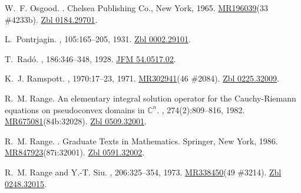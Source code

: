 \documentclass[11pt,a4paper, final, twoside]{article}
\numberwithin{equation}{section}
\begin{document}
\begin{appendices}
\begin{thebibliography}{100}
W.~F. Osgood.
.
\newblock Chelsea Publishing Co., New York, 1965.
\newblock \href{http://www.ams.org/mathscinet-getitem?mr=196039}{MR196039}(33
  \#4233b). \href{http://zbmath.org/?q=an:0184.29701}{Zbl 0184.29701}.

L.~Pontrjagin.
, 105:165--205, 1931.
\newblock \href{http://zbmath.org/?q=an:0002.29101}{Zbl 0002.29101}.

T.~Rad\'o.
, 186:346--348, 1928.
\newblock \href{http://zbmath.org/?q=an:54.0517.02}{JFM 54.0517.02}.

K.~J. Ramspott.
, 1970:17--23,
  1971.
\newblock \href{http://www.ams.org/mathscinet-getitem?mr=302941}{MR302941}(46
  \#2084). \href{http://zbmath.org/?q=an:0225.32009}{Zbl 0225.32009}.

R.~M. Range.
\newblock An elementary integral solution operator for the {C}auchy-{R}iemann
  equations on pseudoconvex domains in {$\mathbb C^n$}.
,
  274(2):809--816, 1982.
\newblock
  \href{http://www.ams.org/mathscinet-getitem?mr=675081}{MR675081}(84b:32028).
  \href{http://zbmath.org/?q=an:0509.32001}{Zbl 0509.32001}.

R.~M. Range.
.
\newblock Graduate Texts in Mathematics. Springer, New York, 1986.
\newblock
  \href{http://www.ams.org/mathscinet-getitem?mr=847923}{MR847923}(87i:32001).
  \href{http://zbmath.org/?q=an:0591.32002}{Zbl 0591.32002}.

R.~M. Range and Y.-T. Siu.
, 206:325--354, 1973.
\newblock \href{http://www.ams.org/mathscinet-getitem?mr=338450}{MR338450}(49
  \#3214). \href{http://zbmath.org/?q=an:0248.32015}{Zbl 0248.32015}.


\end{thebibliography}
\end{appendices}
\end{document}
